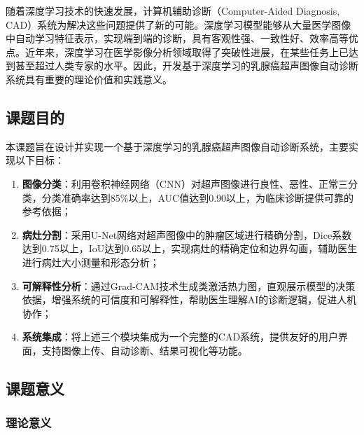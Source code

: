 \documentclass[supercite]{Hust-undergraduate-kaiti}
\theoremstyle{definition}
\begin{document}
随着深度学习技术的快速发展，计算机辅助诊断（Computer-Aided Diagnosis, CAD）系统为解决这些问题提供了新的可能。深度学习模型能够从大量医学图像中自动学习特征表示，实现端到端的诊断，具有客观性强、一致性好、效率高等优点。近年来，深度学习在医学影像分析领域取得了突破性进展，在某些任务上已达到甚至超过人类专家的水平。因此，开发基于深度学习的乳腺癌超声图像自动诊断系统具有重要的理论价值和实践意义。

\subsection{课题目的}

本课题旨在设计并实现一个基于深度学习的乳腺癌超声图像自动诊断系统，主要实现以下目标：

\begin{enumerate}
    \item \textbf{图像分类}：利用卷积神经网络（CNN）对超声图像进行良性、恶性、正常三分类，分类准确率达到85\%以上，AUC值达到0.90以上，为临床诊断提供可靠的参考依据；
    
    \item \textbf{病灶分割}：采用U-Net网络对超声图像中的肿瘤区域进行精确分割，Dice系数达到0.75以上，IoU达到0.65以上，实现病灶的精确定位和边界勾画，辅助医生进行病灶大小测量和形态分析；
    
    \item \textbf{可解释性分析}：通过Grad-CAM技术生成类激活热力图，直观展示模型的决策依据，增强系统的可信度和可解释性，帮助医生理解AI的诊断逻辑，促进人机协作；
    
    \item \textbf{系统集成}：将上述三个模块集成为一个完整的CAD系统，提供友好的用户界面，支持图像上传、自动诊断、结果可视化等功能。
\end{enumerate}

\subsection{课题意义}

\subsubsection{理论意义}
\end{document}

